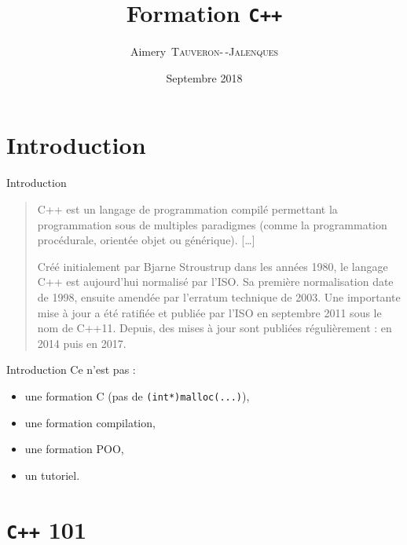 \documentclass{beamer}
\title{Formation \texttt{C++}}
\date{Septembre 2018}
\author[A.~\textsc{Tauveron}]{Aimery~\textsc{Tauveron-\,-Jalenques}}
\institute{\href{https://viarezo.fr/}{ViaRézo}}
\begin{document}
\lstset{breaklines=true, showstringspaces=false}
\lstset{language=[11]C++}

\frame{\titlepage}


\section*{Introduction}
\label{sec:introduction}
\begin{frame}{Introduction}
  \begin{quotation}
    C++ est un langage de programmation compilé permettant la programmation sous de multiples paradigmes (comme la programmation procédurale, orientée objet ou générique). [\dots{}]

    Créé initialement par Bjarne Stroustrup dans les années 1980, le langage C++ est aujourd'hui normalisé par l'ISO. Sa première normalisation date de 1998, ensuite amendée par l'erratum technique de 2003. Une importante mise à jour a été ratifiée et publiée par l'ISO en septembre 2011 sous le nom de C++11. Depuis, des mises à jour sont publiées régulièrement : en 2014 puis en 2017.
  \end{quotation}

\end{frame}

\begin{frame}{Introduction}
  Ce n'est pas :
  \begin{itemize}
  \item une formation C (pas de \texttt{(int*)malloc(...)}),
  \item une formation compilation,
  \item une formation POO,
  \item un tutoriel.
  \end{itemize}
\end{frame}


\frame{\tableofcontents}


\section{\texttt{C++} 101}
\label{sec:cpp101}

\end{document}
